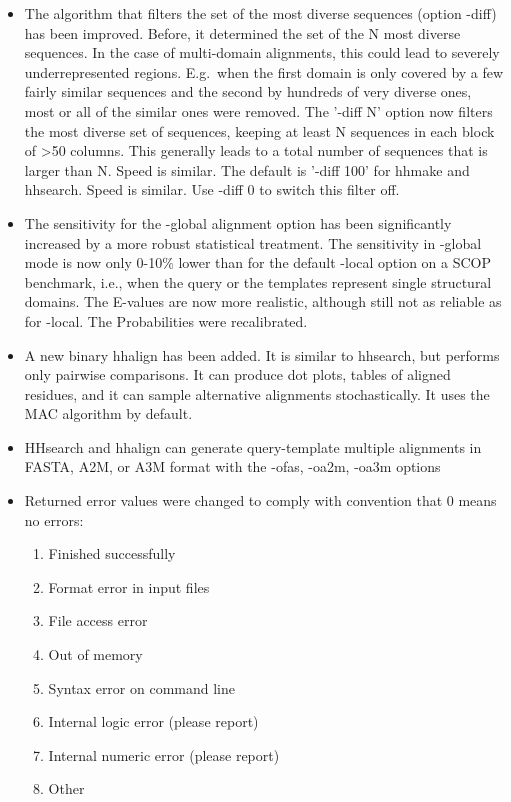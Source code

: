 \documentclass[11pt,a4paper]{article}
\begin{document}
\begin{itemize}
\item{The algorithm that filters the set of the most diverse sequences (option 
  -diff) has been improved. Before, it determined the set of the N most 
  diverse sequences. In the case of multi-domain alignments, this could lead 
  to severely underrepresented regions. E.g.\ when the first domain is only 
  covered by a few fairly similar sequences and the second by hundreds of very 
  diverse ones, most or all of the similar ones were removed. The '-diff N' 
  option now filters the most diverse set of sequences, keeping at least N 
  sequences in each block of >50 columns. This generally leads to a total 
  number of sequences that is larger than N. Speed is similar. The default
  is '-diff 100' for hhmake and hhsearch. Speed is similar. Use -diff 0 to 
  switch this filter off.
}
\item{The sensitivity for the -global alignment option has been significantly 
  increased by a more robust statistical treatment. The sensitivity in -global
  mode is now only 0-10\% lower than for the default -local option on a SCOP
  benchmark, i.e., when the query or the templates represent single structural 
  domains. The E-values are now more realistic, although still not as 
  reliable as for -local. The Probabilities were recalibrated.
}
\item{A new binary hhalign has been added. It is similar to hhsearch, but performs
  only pairwise comparisons. It can produce dot plots, tables of aligned 
  residues, and it can sample alternative alignments stochastically. It uses 
  the MAC algorithm by default. 
}
\item{HHsearch and hhalign can generate query-template multiple alignments in 
  FASTA, A2M, or A3M format with the -ofas, -oa2m, -oa3m options 
}
\item{Returned error values were changed to comply with convention that 0 means no errors:
\begin{enumerate}
   \item{Finished successfully}
   \item{Format error in input files}
   \item{File access error}
   \item{Out of memory }
   \item{Syntax error on command line}
   \item{Internal logic error (please report)}
   \item{Internal numeric error (please report)}
   \item{Other}
\end{enumerate}
}	


\end{itemize}
\end{document}
